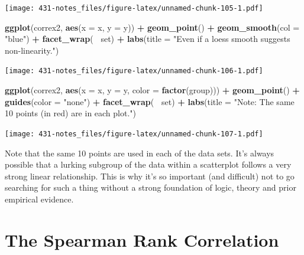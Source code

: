 \documentclass[
]{book}
\newenvironment{Shaded}{\begin{snugshade}}{\end{snugshade}}
\newcommand{\DataTypeTok}[1]{\textcolor[rgb]{0.13,0.29,0.53}{#1}}
\newcommand{\KeywordTok}[1]{\textcolor[rgb]{0.13,0.29,0.53}{\textbf{#1}}}
\newcommand{\NormalTok}[1]{#1}
\newcommand{\OperatorTok}[1]{\textcolor[rgb]{0.81,0.36,0.00}{\textbf{#1}}}
\newcommand{\StringTok}[1]{\textcolor[rgb]{0.31,0.60,0.02}{#1}}
\begin{document}
\texttt{[image: 431-notes\_files/figure-latex/unnamed-chunk-105-1.pdf]}

\begin{Shaded}
\begin{Highlighting}[]
\KeywordTok{ggplot}\NormalTok{(correx2, }\KeywordTok{aes}\NormalTok{(}\DataTypeTok{x =}\NormalTok{ x, }\DataTypeTok{y =}\NormalTok{ y)) }\OperatorTok{+}
\StringTok{    }\KeywordTok{geom_point}\NormalTok{() }\OperatorTok{+}\StringTok{ }
\StringTok{    }\KeywordTok{geom_smooth}\NormalTok{(}\DataTypeTok{col =} \StringTok{"blue"}\NormalTok{) }\OperatorTok{+}
\StringTok{    }\KeywordTok{facet_wrap}\NormalTok{(}\OperatorTok{~}\StringTok{ }\NormalTok{set) }\OperatorTok{+}
\StringTok{    }\KeywordTok{labs}\NormalTok{(}\DataTypeTok{title =} \StringTok{"Even if a loess smooth suggests non-linearity."}\NormalTok{)}
\end{Highlighting}
\end{Shaded}

\texttt{[image: 431-notes\_files/figure-latex/unnamed-chunk-106-1.pdf]}

\begin{Shaded}
\begin{Highlighting}[]
\KeywordTok{ggplot}\NormalTok{(correx2, }\KeywordTok{aes}\NormalTok{(}\DataTypeTok{x =}\NormalTok{ x, }\DataTypeTok{y =}\NormalTok{ y, }\DataTypeTok{color =} \KeywordTok{factor}\NormalTok{(group))) }\OperatorTok{+}
\StringTok{    }\KeywordTok{geom_point}\NormalTok{() }\OperatorTok{+}\StringTok{ }
\StringTok{    }\KeywordTok{guides}\NormalTok{(}\DataTypeTok{color =} \StringTok{"none"}\NormalTok{) }\OperatorTok{+}
\StringTok{    }\KeywordTok{facet_wrap}\NormalTok{(}\OperatorTok{~}\StringTok{ }\NormalTok{set) }\OperatorTok{+}
\StringTok{    }\KeywordTok{labs}\NormalTok{(}\DataTypeTok{title =} \StringTok{"Note: The same 10 points (in red) are in each plot."}\NormalTok{)}
\end{Highlighting}
\end{Shaded}

\texttt{[image: 431-notes\_files/figure-latex/unnamed-chunk-107-1.pdf]}

Note that the same 10 points are used in each of the data sets. It's always possible that a lurking subgroup of the data within a scatterplot follows a very strong linear relationship. This is why it's so important (and difficult) not to go searching for such a thing without a strong foundation of logic, theory and prior empirical evidence.

\hypertarget{the-spearman-rank-correlation}{%
\section{The Spearman Rank Correlation}\label{the-spearman-rank-correlation}}
\end{document}

